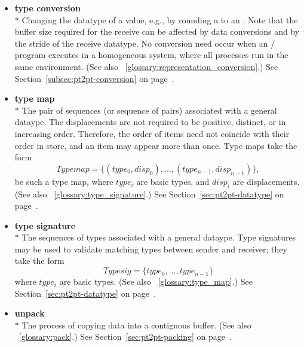 \begin{itemize}
\label{glossary:type_conversion}
\item \textbf{ type conversion} \\*
Changing the datatype of a value, e.g., by rounding a
 to an . Note that the buffer size required for the receive can be affected by data conversions and
by the stride of the receive datatype. No conversion need occur when an \MPI/ program executes in
a homogeneous system, where all processes run in the same environment. (See also ~\ref{glossary:representation_conversion}.)
See Section~\ref{subsec:pt2pt-conversion} on page~\pageref{subsec:pt2pt-conversion}.


\label{glossary:type_map}
\item \textbf{ type map} \\*
The pair of sequences (or sequence of pairs) associated with a general dataype.
The displacements are not required to be positive, distinct, or
in increasing order. Therefore, the order of items need not
coincide with their order in store, and an item may appear more than
once. Type maps take the form
\[
Typemap = \{ (type_0,disp_0), ..., (type_{n-1}, disp_{n-1}) \} ,
\]
be such a type map, where $type_i$ are basic types, and
$disp_i$ are  displacements.
(See also ~\ref{glossary:type_signature}.)
See Section~\ref{sec:pt2pt-datatype} on page~\pageref{sec:pt2pt-datatype}.

\label{glossary:type_signature}
\item \textbf{ type signature} \\*
The sequences of types associated with a general dataype.
Type signatures may be used to validate matching types between sender and receiver; they take the form
\[
Typesig = \{ type_0 , ... , type_{n-1} \}
\]
where $type_i$ are basic types.
(See also ~\ref{glossary:type_map}.)
See Section~\ref{sec:pt2pt-datatype} on page~\pageref{sec:pt2pt-datatype}.

\label{glossary:unpack}
\item \textbf{ unpack} \\*
The process of copying data into a contiguous buffer.
(See also ~\ref{glossary:pack}.)
See Section~\ref{sec:pt2pt-packing} on page~\pageref{sec:pt2pt-packing}.


\end{itemize}
